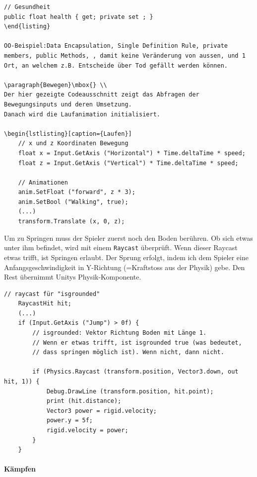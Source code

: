 \begin{lstlisting}
// Gesundheit
public float health { get; private set ; } 
\end{listing}

OO-Beispiel:Data Encapsulation, Single Definition Rule, private members, public Methods, , damit keine Veränderung von aussen, und 1 Ort, an welchem z.B. Entscheide über Tod gefällt werden können.

\paragraph{Bewegen}\mbox{} \\
Der hier gezeigte Codeausschnitt zeigt das Abfragen der Bewegungsinputs und deren Umsetzung.
Danach wird die Laufanimation initialisiert.

\begin{lstlisting}[caption={Laufen}]
	// x und z Koordinaten Bewegung
	float x = Input.GetAxis ("Horizontal") * Time.deltaTime * speed;
	float z = Input.GetAxis ("Vertical") * Time.deltaTime * speed;
        
	// Animationen
	anim.SetFloat ("forward", z * 3);
	anim.SetBool ("Walking", true);
	(...)
	transform.Translate (x, 0, z);
\end{lstlisting}

Um zu Springen muss der Spieler zuerst noch den Boden berühren.
Ob sich etwas unter ihm befindet, wird mit einem \lstinline{Raycast} überprüft.
Wenn dieser Raycast etwas trifft, ist Springen erlaubt.
Der Sprung erfolgt, indem ich dem Spieler eine Anfangsgeschwindigkeit in Y-Richtung (=Kraftstoss aus der Physik) gebe. Den Rest übernimmt Unitys Physik-Komponente.

\begin{lstlisting}[caption={Springen}]
	// raycast für "isgrounded"
	RaycastHit hit;
	(...)
	if (Input.GetAxis ("Jump") > 0f) {
		// isgrounded: Vektor Richtung Boden mit Länge 1. 
		// Wenn er etwas trifft, ist isgrounded true (was bedeutet,
		// dass springen möglich ist). Wenn nicht, dann nicht. 

		if (Physics.Raycast (transform.position, Vector3.down, out hit, 1)) {
			Debug.DrawLine (transform.position, hit.point);
			print (hit.distance);
			Vector3 power = rigid.velocity;
			power.y = 5f;
			rigid.velocity = power;
		}
	}
\end{lstlisting}

\paragraph{Kämpfen}\mbox{} \\

